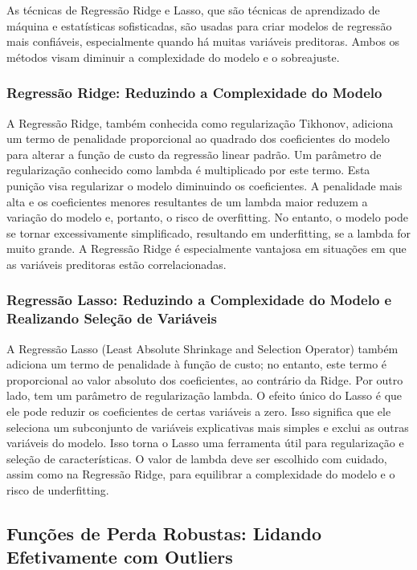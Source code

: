 \documentclass{article}
\begin{document}
As técnicas de Regressão Ridge e Lasso, que são técnicas de aprendizado de máquina e estatísticas sofisticadas, são usadas para criar modelos de regressão mais confiáveis, especialmente quando há muitas variáveis preditoras. Ambos os métodos visam diminuir a complexidade do modelo e o sobreajuste.

\subsubsection{Regressão Ridge: Reduzindo a Complexidade do Modelo}

A Regressão Ridge, também conhecida como regularização Tikhonov, adiciona um termo de penalidade proporcional ao quadrado dos coeficientes do modelo para alterar a função de custo da regressão linear padrão. Um parâmetro de regularização conhecido como lambda é multiplicado por este termo. Esta punição visa regularizar o modelo diminuindo os coeficientes. A penalidade mais alta e os coeficientes menores resultantes de um lambda maior reduzem a variação do modelo e, portanto, o risco de overfitting. No entanto, o modelo pode se tornar excessivamente simplificado, resultando em underfitting, se a lambda for muito grande. A Regressão Ridge é especialmente vantajosa em situações em que as variáveis preditoras estão correlacionadas.

\subsubsection{Regressão Lasso: Reduzindo a Complexidade do Modelo e Realizando Seleção de Variáveis}

A Regressão Lasso (Least Absolute Shrinkage and Selection Operator) também adiciona um termo de penalidade à função de custo; no entanto, este termo é proporcional ao valor absoluto dos coeficientes, ao contrário da Ridge. Por outro lado, tem um parâmetro de regularização lambda. O efeito único do Lasso é que ele pode reduzir os coeficientes de certas variáveis a zero. Isso significa que ele seleciona um subconjunto de variáveis explicativas mais simples e exclui as outras variáveis do modelo. Isso torna o Lasso uma ferramenta útil para regularização e seleção de características. O valor de lambda deve ser escolhido com cuidado, assim como na Regressão Ridge, para equilibrar a complexidade do modelo e o risco de underfitting.

\subsection{Funções de Perda Robustas: Lidando Efetivamente com Outliers}
\end{document}
